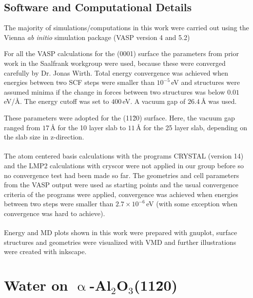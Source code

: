 \documentclass[11pt,DIV=13,BCOR=5mm,a4paper,headinclude]{scrbook}
\begin{document}
\section{Software and Computational Details}
The majority of simulations/computations in this work were carried out using the Vienna \textit{ab initio} simulation package (VASP version 4 and 5.2)\cite{kresse1993,kresse2,kresse3,kresse4,kresse99}


For all the VASP calculations for the (0001) surface the parameters from prior work in the Saalfrank workgroup were used, because these were converged carefully by Dr. Jonas Wirth\cite{WirthJPCC2012,Wirth2014,Wirth2015,Wirth2016}.
Total energy convergence was achieved when energies between two SCF steps were smaller than $10^{-5}\,$eV and structures were assumed minima if the change in forces between two structures was below $0.01\,$eV/\AA{}.
The energy cutoff was set to $400\,$eV.
A vacuum gap of $26.4\,$\AA{} was used.


These parameters were adopted for the (11\=20) surface.
Here, the vacuum gap ranged from $17\,$\AA{} for the 10 layer slab to $11\,$\AA{} for the 25 layer slab, depending on the slab size in z-direction.
\\\\

The atom centered basis calculations with the programs CRYSTAL\cite{crystal14} (version 14) and the LMP2 calculations with cryscor\cite{cryscor} were not applied in our group before so no convergence test had been made so far.
The geometries and cell parameters from the VASP output were used as starting points and the usual convergence criteria of the programs were applied, convergence was achieved when energies between two steps were smaller than $2.7\times 10^{-6}\,$eV (with some exception when convergence was hard to achieve).
\\\\

Energy and MD plots shown in this work were prepared with gnuplot\cite{gnuplot}, surface structures and geometries were visualized with VMD\cite{vmd} and further illustrations were created with inkscape\cite{inkscape}.

\chapter{Water on $\upalpha$-Al$_2$O$_3$(11\=20)}
\end{document}
